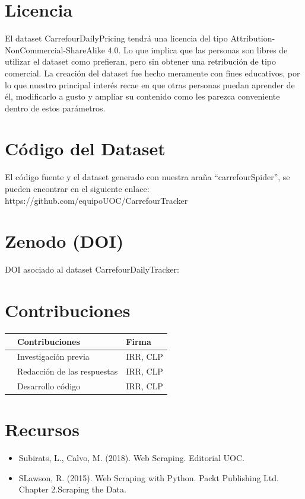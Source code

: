 \documentclass{article}
\begin{document}
\section{Licencia}
El dataset CarrefourDailyPricing tendrá una licencia del tipo Attribution-NonCommercial-ShareAlike 4.0. Lo que implica que las personas son libres de utilizar el dataset como prefieran, pero sin obtener una retribución de tipo comercial. La creación del dataset fue hecho meramente con fines educativos, por lo que nuestro principal interés recae en que otras personas puedan aprender de él, modificarlo a gusto y ampliar su contenido como les parezca conveniente dentro de estos parámetros.

\pagebreak
\section{Código del Dataset}
El código fuente y el dataset generado con nuestra araña  “carrefourSpider”, se pueden encontrar en el siguiente enlace: https://github.com/equipoUOC/CarrefourTracker

\section{Zenodo (DOI)}
DOI asociado al dataset CarrefourDailyTracker: 

\section{Contribuciones}

\begin{table}[H]
    \centering
    \begin{tabular}{rll}
    & Contribuciones & Firma \\
    \hline
    & Investigación previa & IRR, CLP  \\
    & Redacción de las respuestas & IRR, CLP \\
    & Desarrollo código & IRR, CLP \\
    \end{tabular}
\end{table}


\section{Recursos}
\begin{itemize}
    \item Subirats, L., Calvo, M. (2018). Web Scraping. Editorial UOC.
    \item SLawson, R. (2015). Web Scraping with Python. Packt Publishing Ltd. Chapter 2.Scraping the Data.

\end{itemize}
\end{document}
